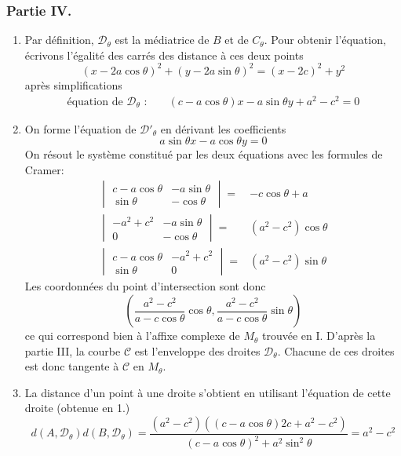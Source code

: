 \subsubsection*{Partie IV.}
\begin{enumerate}
 \item Par définition, $\mathcal D_\theta$ est la médiatrice de $B$ et de $C_\theta$. Pour obtenir l'équation, écrivons l'égalité des carrés des distance à ces deux points
\begin{displaymath}
 (x-2a\cos \theta)^2+(y-2a\sin \theta)^2=(x-2c)^2+y^2
\end{displaymath}
après simplifications 
\begin{align*}
 \text{équation de $\mathcal D_\theta$ : } & &
(c-a\cos \theta)x - a\sin\theta y +a^2-c^2 =0
\end{align*}

\item On forme l'équation de $\mathcal D'_\theta$ en dérivant les coefficients
\begin{displaymath}
 a\sin \theta x-a\cos \theta y =0
\end{displaymath}
On résout le système constitué par les deux équations avec les formules de Cramer:
\begin{align*}
 \begin{vmatrix}
  c-a\cos\theta & -a\sin \theta \\
  \sin \theta & -\cos\theta
 \end{vmatrix} =& -c\cos \theta +a \\
\begin{vmatrix}
 -a^2+c^2 & -a\sin \theta \\
0 & -\cos \theta
\end{vmatrix}=&(a^2-c^2)\cos\theta \\
\begin{vmatrix}
 c-a\cos\theta &-a^2+c^2 \\
\sin \theta & 0
\end{vmatrix}=&(a^2-c^2)\sin \theta
\end{align*}
Les coordonnées du point d'intersection sont donc
\begin{displaymath}
 \left( \dfrac{a^2-c^2}{a-c\cos\theta}\cos \theta , \dfrac{a^2-c^2}{a-c\cos\theta}\sin \theta \right) 
\end{displaymath}
ce qui correspond bien à l'affixe complexe de $M_\theta$ trouvée en I. D'après la partie III, la courbe $\mathcal C$ est l'enveloppe des droites $\mathcal D_\theta$. Chacune de ces droites est donc tangente à $\mathcal C$ en $M_\theta$.
\item La distance d'un point à une droite s'obtient en utilisant l'équation de cette droite (obtenue en 1.)
\begin{displaymath}
 d(A,\mathcal D_\theta)d(B,\mathcal D_\theta)
=\dfrac{(a^2-c^2)\left((c-a\cos\theta)2c+a^2-c^2 \right) }{(c-a\cos\theta)^2+a^2\sin^2\theta}
=a^2-c^2
\end{displaymath}


\end{enumerate}
